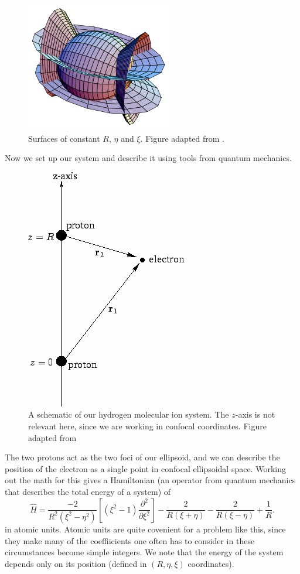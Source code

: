 \documentclass[journal=jacsat,manuscript=communication]{achemso}
\begin{document}
\begin{figure}[H]
  \includegraphics{figures/confocal}
  \caption{Surfaces of constant $R$, $\eta$ and $\xi$.  Figure adapted from \citet{weissteinConfocalEllipsoidalCoordinates}.}
  \label{fig:confocal}
\end{figure}
Now we set up our system and describe it using tools from quantum mechanics.
\begin{figure}[H]
	\includegraphics[width=.3\textwidth]{figures/hydrogenmolecule.png}
	\caption{A schematic of our hydrogen molecular ion system.  The $z$-axis is not relevant here, since we are working in confocal coordinates. Figure adapted from \citet{fitzpatrickHydrogenMoleculeIon}}
\end{figure}
The two protons act as the two foci of our ellipsoid, and we can describe the position of the electron as a single point in confocal ellipsoidal space.  Working out the math for this gives a Hamiltonian (an operator from quantum mechanics that describes the total energy of a system) of
\begin{equation}
	\hat{H} = \frac{-2}{R^2\left(\xi^2-\eta^2\right)}\left[\left(\xi^2-1\right)\frac{\partial^2 }{\partial\xi^2}\right]-\frac{2}{R(\xi+\eta)}-\frac{2}{R(\xi-\eta)}+\frac{1}{R}.
\end{equation}
in atomic units.  Atomic units are quite covenient for a problem like this, since they make many of the coeffiicients one often has to consider in these circumstances become simple integers.  We note that the energy of the system depends only on its position (defined in $(R,\eta,\xi)$ coordinates).
\end{document}
